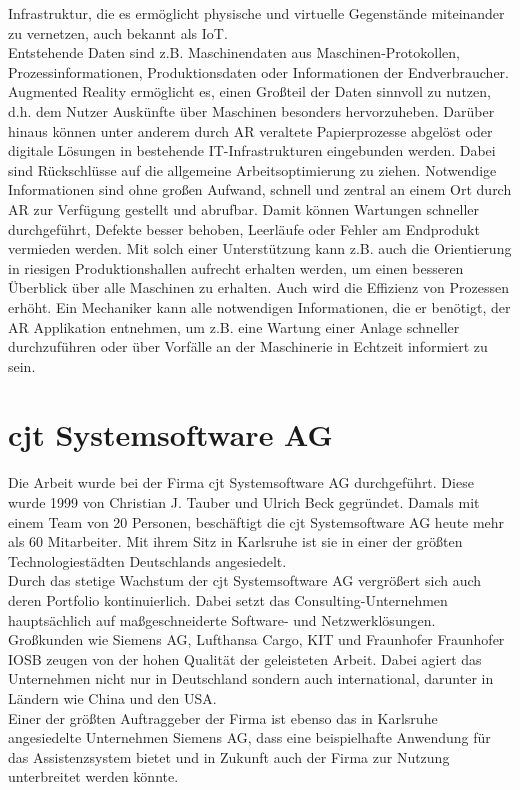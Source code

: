 Infrastruktur, die es ermöglicht physische und virtuelle Gegenstände miteinander zu vernetzen, auch bekannt als \ac{IoT}.
\\ 
Entstehende Daten sind z.B. Maschinendaten aus Maschinen-Protokollen, Prozessinformationen, Produktionsdaten oder 
Informationen der Endverbraucher. \cite{industrie40.2019f} Augmented Reality ermöglicht es, einen Großteil der Daten sinnvoll zu nutzen, d.h. 
dem Nutzer Auskünfte über Maschinen besonders hervorzuheben. Darüber hinaus können unter anderem durch \acs{AR} veraltete Papierprozesse 
abgelöst oder digitale Lösungen in bestehende IT-Infrastrukturen eingebunden werden. \cite{industrie40ar.2019n} 
Dabei sind Rückschlüsse auf die allgemeine Arbeitsoptimierung zu ziehen. Notwendige Informationen sind ohne 
großen Aufwand, schnell und zentral an einem Ort durch \acs{AR} zur Verfügung gestellt und abrufbar. Damit können 
Wartungen schneller durchgeführt, Defekte besser behoben, Leerläufe oder Fehler am Endprodukt vermieden werden. Mit solch einer Unterstützung 
kann z.B. auch die Orientierung in riesigen Produktionshallen aufrecht erhalten werden, um einen besseren Überblick über alle Maschinen 
zu erhalten. Auch wird die Effizienz von Prozessen erhöht. Ein Mechaniker kann alle notwendigen Informationen, die er benötigt, der 
\acl{AR} Applikation entnehmen, um z.B. eine Wartung einer Anlage schneller durchzuführen oder über Vorfälle an der Maschinerie in Echtzeit 
informiert zu sein. 
\pagebreak
\section{cjt Systemsoftware AG}
\label{chap:cjt}
Die Arbeit wurde bei der Firma cjt Systemsoftware AG durchgeführt. Diese wurde
1999 von Christian J. Tauber und Ulrich Beck gegründet. Damals mit einem Team
von 20 Personen, beschäftigt die cjt Systemsoftware AG heute mehr als 60 Mitarbeiter. 
Mit ihrem Sitz in Karlsruhe ist sie in einer der größten Technologiestädten Deutschlands angesiedelt.
\\
\linebreak
Durch das stetige Wachstum der cjt Systemsoftware AG vergrößert sich auch deren
Portfolio kontinuierlich. Dabei setzt das Consulting-Unternehmen hauptsächlich auf maßgeschneiderte
Software- und Netzwerklösungen. Großkunden wie Siemens AG, Lufthansa Cargo,
\ac{KIT} und Fraunhofer \acs{Fraunhofer IOSB} zeugen von der hohen Qualität der geleisteten Arbeit. 
Dabei agiert das Unternehmen nicht nur in Deutschland sondern auch international, darunter in Ländern wie China und den USA.
\\ 
\linebreak
Einer der größten Auftraggeber der Firma ist ebenso das in Karlsruhe angesiedelte Unternehmen Siemens AG, dass eine beispielhafte 
Anwendung für das Assistenzsystem bietet und in Zukunft auch der Firma zur Nutzung unterbreitet werden könnte. 
\pagebreak

